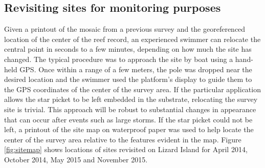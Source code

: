 
\subsection{Revisiting sites for monitoring purposes}
Given a printout of the mosaic from a previous survey and the georeferenced location of the center of the reef record, an experienced swimmer can relocate the central point in seconds to a few minutes, depending on how much the site has changed. The typical procedure was to approach the site by boat using a hand-held GPS.  Once within a range of a few meters, the pole was dropped near the desired location and the swimmer used the platform's display to guide them to the GPS coordinates of the center of the survey area.
If the particular application allows the star picket to be left embedded in the substrate, relocating the survey site is trivial. This approach will be robust to substantial changes in appearance that can occur after events such as large storms.  If the star picket could not be left, a printout of the site map on waterproof paper was used to help locate the center of the survey area relative to the features evident in the map.
Figure \ref{fig:sitemap} shows locations of sites revisited on Lizard Island for April 2014, October 2014, May 2015 and November 2015.

